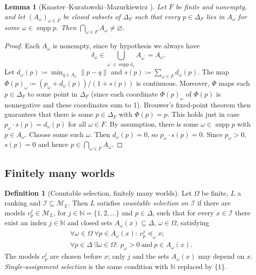 \documentclass[11pt]{article}
\newtheorem{lemma}[theorem]{Lemma}
\theoremstyle{definition}
\newtheorem{definition}[theorem]{Definition}
\theoremstyle{remark}
\newcommand{\M}{\mathcal M}
\newcommand{\I}{\mathcal I}
\newcommand{\supp}{\operatorname{supp}}
\begin{document}
\begin{lemma}[Knaster--Kuratowski--Mazurkiewicz {\cite{KKM1929}}]\label{lem:kkm}
Let $F$ be finite and nonempty, and let $(A_\omega)_{\omega\in F}$ be closed subsets of $\Delta_F$ such that every $p\in\Delta_F$ lies in $A_\omega$ for some $\omega\in\supp p$. Then $\bigcap_{\omega\in F}A_\omega\ne\varnothing$.
\end{lemma}
\begin{proof}
Each $A_\omega$ is nonempty, since by hypothesis we always have
\[
\delta_\omega\in\bigcup_{\omega^\prime\in\supp \delta_\omega}A_{\omega^\prime}=A_\omega.
\]
Let $d_\omega(p)\coloneqq\min_{q\in A_\omega}\lVert p-q \rVert$ and $s(p)\coloneqq\sum_{\omega\in F} d_\omega(p)$. The map $\Phi(p)_\omega\coloneqq(p_\omega+d_\omega(p))/(1+s(p))$ is continuous. Moreover, $\Phi$ maps each $p\in\Delta_F$ to some point in $\Delta_F$ (since each coordinate $\Phi(p)_\omega$ of $\Phi(p)$ is nonnegative and these coordinates sum to 1). Brouwer's fixed-point theorem then guarantees that there is some $p\in\Delta_F$ with $\Phi(p)=p$. This holds just in case $p_\omega\cdot s(p)=d_\omega(p)$ for all $\omega\in F$. By assumption, there is some $\omega\in\supp p$ with $p\in A_\omega$. Choose some such $\omega$. Then $d_\omega(p)=0$, so $p_\omega\cdot s(p)=0$. Since $p_\omega>0$, $s(p)=0$ and hence $p\in\bigcap_{\omega\in F}A_\omega$.
\end{proof}

\subsection{Finitely many worlds}

\begingroup\color{red}
\begin{definition}[Countable selection, finitely many worlds]\label{def:selection-finite}
Let $\Omega$ be finite, $L$ a ranking and $\I\subseteq\M_L$. Then $L$ satisfies \emph{countable selection on $\I$} if there are models $c^j_p\in\M_L$, for $j\in\mathbb N=\{1,2,\ldots\}$ and $p\in\Delta$, such that for every $x\in\I$ there exist an index $j\in\mathbb N$ and closed sets $A_\omega(x)\subseteq\Delta$, $\omega\in\Omega$, satisfying
\begin{align}
&\forall\omega\in\Omega\ \forall p\in A_\omega(x):\ c^j_p\preceq_\omega x;\tag{F1}\label{eq:f-comparison}\\
&\forall p\in\Delta\ \exists\omega\in\Omega:\ p_\omega>0\ \text{and}\ p\in A_\omega(x).\tag{F2}\label{eq:f-support}
\end{align}
The models $c^j_p$ are chosen before $x$; only $j$ and the sets $A_\omega(x)$ may depend on $x$. \emph{Single-assignment selection} is the same condition with $\mathbb N$ replaced by $\{1\}$.
\end{definition}
\end{document}

